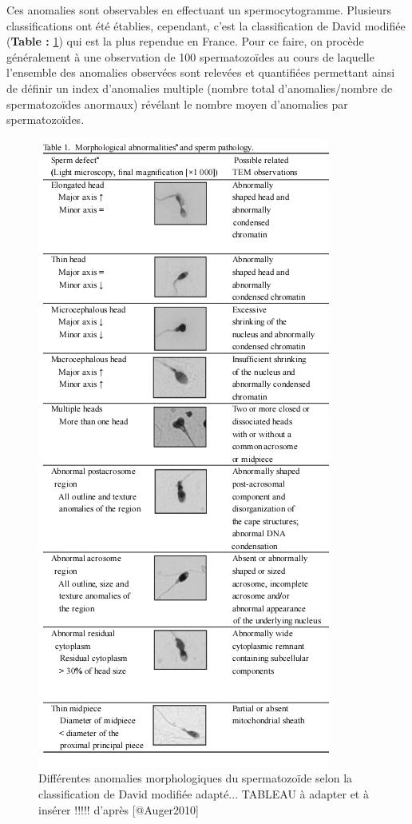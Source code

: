 \documentclass[12pt,twoside]{reedthesis}
\theoremstyle{definition}
\theoremstyle{definition}
\theoremstyle{remark}
\begin{document}
  Ces anomalies sont observables en effectuant un spermocytogramme.
  Plusieurs classifications ont été établies, cependant, c'est la
  classification de David modifiée (\textbf{Table :}
  \ref{fig:anomaliemorphosperm}) qui est la plus rependue en France. Pour
  ce faire, on procède généralement à une observation de 100
  spermatozoïdes au cours de laquelle l'ensemble des anomalies observées
  sont relevées et quantifiées permettant ainsi de définir un index
  d'anomalies multiple (nombre total d'anomalies/nombre de spermatozoïdes
  anormaux) révélant le nombre moyen d'anomalies par spermatozoïdes.
  
  \begin{figure}
  
  {\centering \includegraphics[scale=.75]{figure/sperm_morpho_abnormalities} 
  
  }
  
  \caption[Différentes anomalies morphologiques du spermatozoïde selon la classification de David modifiée adapté... TABLEAU à adapter et à insérer !!!!!]{Différentes anomalies morphologiques du spermatozoïde selon la classification de David modifiée adapté... TABLEAU à adapter et à insérer !!!!! d'après [@Auger2010]}\label{fig:anomaliemorphosperm}
  \end{figure}
  
\end{document}
